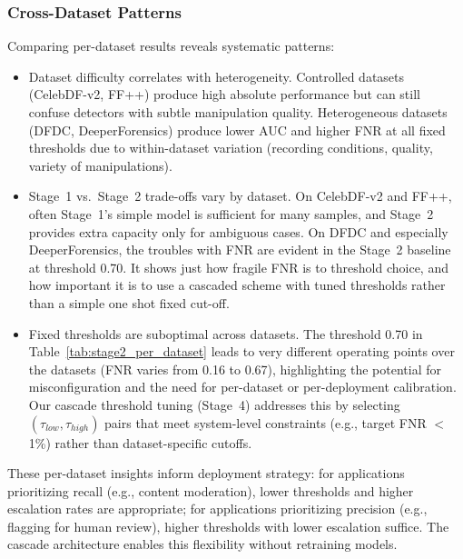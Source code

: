 \subsubsection{Cross-Dataset Patterns}
Comparing per\hyp dataset results reveals systematic patterns:
\begin{itemize}[leftmargin=*,itemsep=2pt,parsep=0pt]
  \item Dataset difficulty correlates with heterogeneity. Controlled datasets (CelebDF\hyp v2, FF++) produce high absolute performance but can still confuse detectors with subtle manipulation quality. Heterogeneous datasets (DFDC, DeeperForensics) produce lower AUC and higher FNR at all fixed thresholds due to within\hyp dataset variation (recording conditions, quality, variety of manipulations).

  \item Stage~1 vs.\ Stage~2 trade\hyp offs vary by dataset. On CelebDF\hyp v2 and FF++, often Stage~1's simple model is sufficient for many samples, and Stage~2 provides extra capacity only for ambiguous cases. On DFDC and especially DeeperForensics, the troubles with FNR are evident in the Stage~2 baseline at threshold 0.70. It shows just how fragile FNR is to threshold choice, and how important it is to use a cascaded scheme with tuned thresholds rather than a simple one shot fixed cut\hyp off.

  \item Fixed thresholds are suboptimal across datasets. The threshold 0.70 in Table~\ref{tab:stage2_per_dataset} leads to very different operating points over the datasets (FNR varies from \num{0.16} to \num{0.67}), highlighting the potential for misconfiguration and the need for per\hyp dataset or per\hyp deployment calibration. Our cascade threshold tuning (Stage~4) addresses this by selecting $(\tau_{low},\tau_{high})$ pairs that meet system\hyp level constraints (e.g., target FNR $<$ 1\%) rather than dataset\hyp specific cutoffs.
\end{itemize}

These per\hyp dataset insights inform deployment strategy: for applications prioritizing recall (e.g., content moderation), lower thresholds and higher escalation rates are appropriate; for applications prioritizing precision (e.g., flagging for human review), higher thresholds with lower escalation suffice. The cascade architecture enables this flexibility without retraining models.

